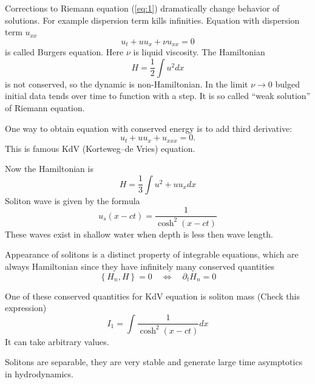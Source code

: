 \documentclass[12pt]{article}
\begin{document}
Corrections to Riemann equation (\ref{eq:1}) dramatically change behavior of solutions. For example
dispersion term kills infinities. Equation with dispersion term $u_{xx}$
\begin{equation}
  \label{eq:7}
  u_{t}+u u_{x}+\nu u_{xx}=0
\end{equation}
is called Burgers equation. Here $\nu$ is liquid viscosity. 
The Hamiltonian
\begin{equation}
  \label{eq:8}
  H=\frac{1}{2} \int u^{2} dx
\end{equation}
is not conserved, so the dynamic is non-Hamiltonian. In the limit $\nu\to 0$ bulged initial data
tends over time to function with a step. It is so called ``weak solution'' of Riemann equation. 

One way to obtain equation with conserved energy is to add third derivative:
\begin{equation}
  \label{eq:9}
  u_{t}+u u_{x}+u_{xxx}=0.
\end{equation}
This is famous KdV (Korteweg–de Vries) equation. 

Now the Hamiltonian is
\begin{equation}
  \label{eq:10}
  H=\frac{1}{3}\int u^{2}+u u_{x} dx
\end{equation}
Soliton wave is given by the formula
\begin{equation}
  \label{eq:11}
  u_{s}(x-ct)=\frac{1}{\cosh^{2}(x-ct)}
\end{equation}
These waves exist in shallow water when depth is less then wave length. 

Appearance of solitons is a distinct property of integrable equations, which are always Hamiltonian
since they have infinitely many conserved quantities
\begin{equation}
  \label{eq:12}
  \left\{ H_{n},H\right\} =0\quad \Leftrightarrow \quad\partial_{t} H_{n}=0
\end{equation}

One of these conserved quantities for KdV equation is soliton mass (Check this expression)
\begin{equation}
  \label{eq:13}
  I_{1}=\int \frac{1}{\cosh^{2}(x-ct)} dx
\end{equation}
It can take arbitrary values. 

Solitons are separable, they are very stable and generate large time asymptotics in hydrodynamics. 
\end{document}
